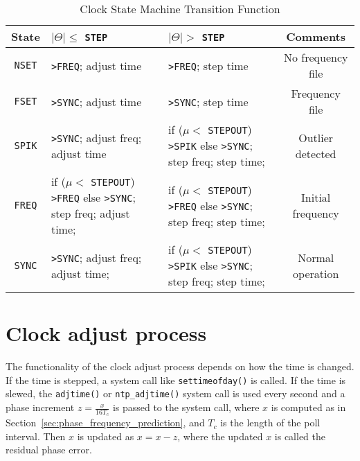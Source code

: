 \begin{table}[ht]
    \centering
    \caption{Clock State Machine Transition Function}
    \label{tab:clock_state_machine_transition_function}
    \begin{tabular}{|c|p{43mm}|p{43mm}|c|}
        \hline
        State &\hfil $|\Theta|\le$ \verb|STEP| & \hfil $|\Theta|>$ \verb|STEP| 
        & Comments \\
        \hline
        \verb|NSET| & \verb|>FREQ|; adjust time & \verb|>FREQ|; step time 
            & No frequency file \\
        \hline
        \verb|FSET| & \verb|>SYNC|; adjust time & \verb|>SYNC|; step time
            & Frequency file \\
        \hline
        \verb|SPIK| & \verb|>SYNC|; adjust freq; adjust time 
        & if ($\mu <$ \verb|STEPOUT|) \verb|>SPIK| \newline 
        else \verb|>SYNC|; step freq; step time;
        & Outlier detected \\
        \hline
        \verb|FREQ| & if ($\mu <$ \verb|STEPOUT|) \verb|>FREQ| \newline 
        else \verb|>SYNC|; step freq; adjust time;
        & if ($\mu <$ \verb|STEPOUT|) \verb|>FREQ| \newline 
        else \verb|>SYNC|; step freq; step time;
        & Initial frequency \\
        \hline
        \verb|SYNC| & \verb|>SYNC|; adjust freq; adjust time;
        & if ($\mu <$ \verb|STEPOUT|) \verb|>SPIK| \newline 
        else \verb|>SYNC|; step freq; step time; & Normal operation \\
        \hline
    \end{tabular}
\end{table}

\section{Clock adjust process}%
\label{sec:clock_adjust_process}
The functionality of the clock adjust process depends on how the time is
changed.  If the time is stepped, a system call like \verb|settimeofday()| is
called. If the time is slewed, the \verb|adjtime()| or \verb|ntp_adjtime()|
system call is used every second and a phase increment $z=\frac{x}{16T_c}$
is passed to the system call, where $x$ is computed as in
Section~\ref{sec:phase_frequency_prediction}, and $T_c$ is the length of the
poll interval.  Then $x$ is updated as $x=x-z$, where the updated $x$ is
called the residual phase error.

